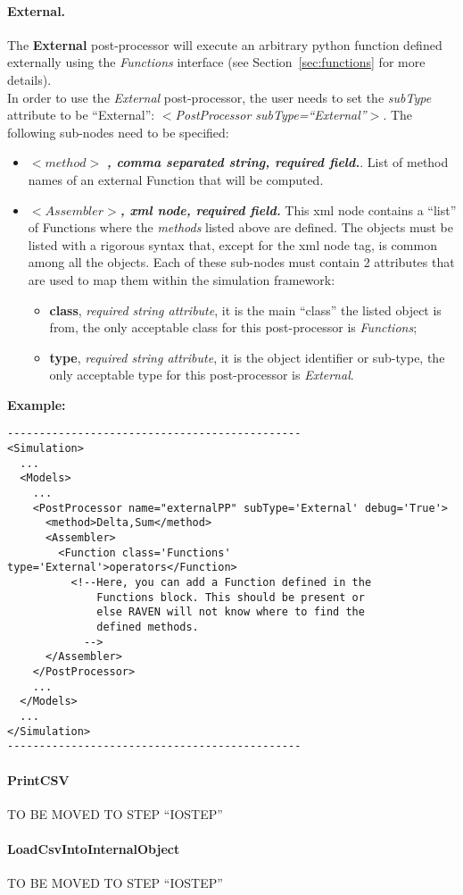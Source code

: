 \paragraph{External.}
\label{External}
The \textbf{External} post-processor will execute an arbitrary python function
defined externally using the \textit{Functions} interface (see 
Section~\ref{sec:functions} for more details).
\\In order to use the \textit{External} post-processor, the user needs to set 
the \textit{subType} attribute to be ``External'': 
\textit{$<$PostProcessor subType=``External''$>$}. 
The following sub-nodes need to be specified:
\begin{itemize}
\item $<method>$ \textbf{\textit{, comma separated string, required field.}}.
List of method names of an external Function that will be computed.
\item $<Assembler>$\textbf{\textit{, xml node, required field.}} This xml node
contains a ``list'' of Functions where the \textit{methods} listed above are
defined. The objects must be listed with a rigorous syntax that, except for the
xml node tag, is common among all the objects. 
Each of these sub-nodes must contain 2 attributes that are used to map them
within the simulation framework:
   \begin{itemize}
     \item \textbf{class}, \textit{required string attribute}, it is the main
           ``class'' the listed object is from, the only acceptable class for
           this post-processor is \textit{Functions};
     \item \textbf{type},  \textit{required string attribute}, it is the object
           identifier or sub-type, the only acceptable type for this 
           post-processor is \textit{External}.
    \end{itemize}
\end{itemize}
\textbf{Example:}
\begin{lstlisting}[style=XML]
----------------------------------------------
<Simulation>
  ...
  <Models>
    ...
    <PostProcessor name="externalPP" subType='External' debug='True'>
      <method>Delta,Sum</method>
      <Assembler>
        <Function class='Functions' type='External'>operators</Function> 
          <!--Here, you can add a Function defined in the
              Functions block. This should be present or
              else RAVEN will not know where to find the
              defined methods.
            -->
      </Assembler>
    </PostProcessor>
    ...
  </Models>
  ...
</Simulation>
----------------------------------------------
\end{lstlisting}
\paragraph{PrintCSV}
\label{PrintCSV}
TO BE MOVED TO STEP ``IOSTEP''
\paragraph{LoadCsvIntoInternalObject}
\label{LoadCsvIntoInternalObject}
TO BE MOVED TO STEP ``IOSTEP''
